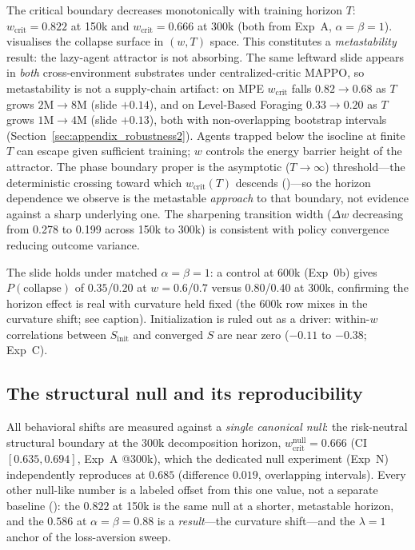 \documentclass[letterpaper]{article}
\theoremstyle{plain}
\newcommand{\wcrit}{w_{\mathrm{crit}}}
\begin{document}
The critical boundary decreases monotonically with training horizon $T$:
$\wcrit = 0.822$ at 150k and $\wcrit = 0.666$ at 300k (both from Exp~A,
$\alpha{=}\beta{=}1$).
 visualises the collapse surface in $(w, T)$ space.
This constitutes a \emph{metastability} result: the lazy-agent attractor
is not absorbing.
The same leftward slide appears in \emph{both} cross-environment substrates under
centralized-critic MAPPO, so metastability is not a supply-chain artifact: on MPE
$\wcrit$ falls $0.82\!\to\!0.68$ as $T$ grows $2\mathrm{M}\!\to\!8\mathrm{M}$
(slide $+0.14$), and on Level-Based Foraging $0.33\!\to\!0.20$ as
$T$ grows $1\mathrm{M}\!\to\!4\mathrm{M}$ (slide $+0.13$), both with
non-overlapping bootstrap intervals (Section~\ref{sec:appendix_robustness2}).
Agents trapped below the isocline at finite $T$ can escape given
sufficient training; $w$ controls the energy barrier height of the
attractor.
The phase boundary proper is the asymptotic ($T\!\to\!\infty$) threshold---the
deterministic crossing toward which $\wcrit(T)$ descends ()---so
the horizon dependence we observe is the metastable \emph{approach} to that
boundary, not evidence against a sharp underlying one.
The sharpening transition width ($\Delta w$ decreasing from 0.278 to
0.199 across 150k to 300k) is consistent with policy convergence reducing
outcome variance.

The slide holds under matched $\alpha{=}\beta{=}1$: a control at 600k (Exp~0b)
gives $P(\mathrm{collapse})$ of $0.35$/$0.20$ at $w{=}0.6$/$0.7$ versus
$0.80$/$0.40$ at 300k, confirming the horizon effect is real with curvature held
fixed (the  600k row mixes in the curvature shift; see caption).
Initialization is ruled out as a driver: within-$w$ correlations between
$S_{\mathrm{init}}$ and converged $S$ are near zero ($-0.11$ to $-0.38$; Exp~C).

\subsection{The structural null and its reproducibility}
\label{sec:results_null}

All behavioral shifts are measured against a \emph{single canonical null}: the
risk-neutral structural boundary at the 300k decomposition horizon,
$\wcrit^{\text{null}}=0.666$ (CI $[0.635,0.694]$, Exp~A @300k), which the
dedicated null experiment (Exp~N) independently reproduces at $0.685$
(difference $0.019$, overlapping intervals). Every other null-like number is a
labeled offset from this one value, not a separate baseline
(): the $0.822$ at 150k is the same null at a shorter,
metastable horizon, and the $0.586$ at $\alpha{=}\beta{=}0.88$ is a
\emph{result}---the curvature shift---and the $\lambda{=}1$ anchor of the
loss-aversion sweep.
\end{document}
